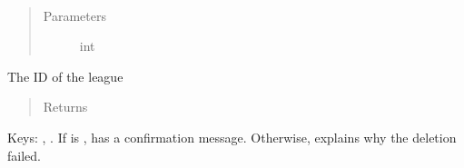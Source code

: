 \documentclass[letterpaper,10pt,english]{sphinxmanual}
\begin{document}
\begin{fulllineitems}
\label{\detokenize{tiger_leagues/models/readme:tiger_leagues.models.admin_model.delete_league}}~\begin{quote}\begin{description}
\item[{Parameters}] \leavevmode
{} \textendash{} int

\end{description}\end{quote}

The ID of the league
\begin{quote}\begin{description}
\item[{Returns}] \leavevmode
{}

\end{description}\end{quote}

Keys: , . If  is ,  has 
a confirmation message. Otherwise,  explains why the deletion failed.

\end{fulllineitems}

\end{document}
